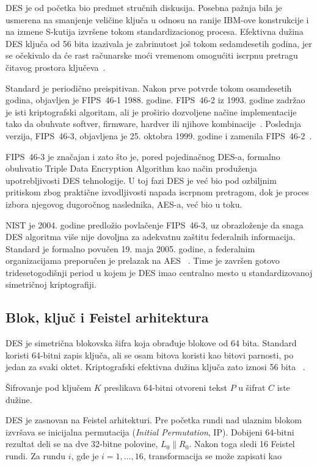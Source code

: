 DES je od početka bio predmet stručnih diskusija. Posebna pažnja bila
je usmerena na smanjenje veličine ključa u odnosu na ranije IBM-ove
konstrukcije i na izmene S-kutija izvršene tokom standardizacionog
procesa. Efektivna dužina DES ključa od 56 bita izazivala je
zabrinutost još tokom sedamdesetih godina, jer se očekivalo da će rast
računarske moći vremenom omogućiti iscrpnu pretragu čitavog prostora
ključeva~\cite{nist-des-history}.

Standard je periodično preispitivan. Nakon prve potvrde tokom
osamdesetih godina, objavljen je FIPS~46-1 1988. godine. FIPS~46-2 iz
1993. godine zadržao je isti kriptografski algoritam, ali je proširio
dozvoljene načine implementacije tako da obuhvate softver, firmware,
hardver ili njihove kombinacije~\cite{fips46-2-history}. Poslednja
verzija, FIPS~46-3, objavljena je 25. oktobra 1999. godine i zamenila
FIPS~46-2~\cite{fips46-3}.

FIPS~46-3 je značajan i zato što je, pored pojedinačnog DES-a,
formalno obuhvatio Triple Data Encryption Algorithm kao način
produženja upotrebljivosti DES tehnologije. U toj fazi DES je već bio
pod ozbiljnim pritiskom zbog praktične izvodljivosti napada iscrpnom
pretragom, dok je proces izbora njegovog dugoročnog naslednika, AES-a,
već bio u toku.

NIST je 2004. godine predložio povlačenje FIPS~46-3, uz obrazloženje
da snaga DES algoritma više nije dovoljna za adekvatnu zaštitu
federalnih informacija. Standard je formalno povučen 19. maja 2005.
godine, a federalnim organizacijama preporučen je prelazak na AES
~\cite{des-withdrawal-2005}. Time je završen gotovo tridesetogodišnji
period u kojem je DES imao centralno mesto u standardizovanoj
simetričnoj kriptografiji.


\subsection{Blok, ključ i Feistel arhitektura}
\label{subsec:des_arhitektura}

DES je simetrična blokovska šifra koja obrađuje blokove od 64 bita.
Standard koristi 64-bitni zapis ključa, ali se osam bitova koristi kao
bitovi parnosti, po jedan za svaki oktet. Kriptografski efektivna
dužina ključa zato iznosi 56 bita
~\cite{fips46-3}.

Šifrovanje pod ključem $K$ preslikava 64-bitni otvoreni tekst $P$ u
šifrat $C$ iste dužine.

DES je zasnovan na Feistel arhitekturi. Pre početka rundi nad ulaznim
blokom izvršava se inicijalna permutacija (\emph{Initial
Permutation}, IP). Dobijeni 64-bitni rezultat deli se na dve
32-bitne polovine,
$L_0 \parallel R_0$.
Nakon toga sledi 16 Feistel rundi. Za rundu $i$, gde je
$i=1,\ldots,16$, transformacija se može zapisati kao

